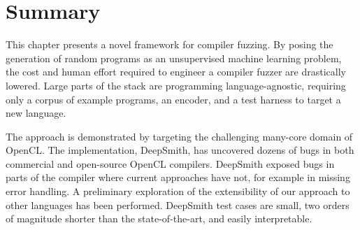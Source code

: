 \section{Summary}
\label{sec:deepsmith-conclusion}

This chapter presents a novel framework for compiler fuzzing. By posing the generation of random programs as an unsupervised machine learning problem, the cost and human effort required to engineer a compiler fuzzer are drastically lowered. Large parts of the stack are programming language-agnostic, requiring only a corpus of example programs, an encoder, and a test harness to target a new language.

The approach is demonstrated by targeting the challenging many-core domain of OpenCL. The implementation, DeepSmith, has uncovered dozens of bugs in both commercial and open-source OpenCL compilers. DeepSmith exposed bugs in parts of the compiler where current approaches have not, for example in missing error handling. A preliminary exploration of the extensibility of our approach to other languages has been performed. DeepSmith test cases are small, two orders of magnitude shorter than the state-of-the-art, and easily interpretable.
